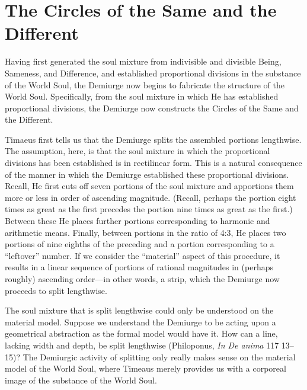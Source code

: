 
\section{The Circles of the Same and the Different} %
\label{sec:the_circles_of_the_same_and_the_different}

Having first generated the soul mixture from indivisible and divisible Being, Sameness, and Difference, and established proportional divisions in the substance of the World Soul, the Demiurge now begins to fabricate the structure of the World Soul. Specifically, from the soul mixture in which He has established proportional divisions, the Demiurge now constructs the Circles of the Same and the Different.

Timaeus first tells us that the Demiurge splits the assembled portions lengthwise. The assumption, here, is that the soul mixture in which the proportional divisions has been established is in rectilinear form. This is a natural consequence of the manner in which the Demiurge established these proportional divisions. Recall, He first cuts off seven portions of the soul mixture and apportions them more or less in order of ascending magnitude. (Recall, perhaps the portion eight times as great as the first precedes the portion nine times as great as the first.) Between these He places further portions corresponding to harmonic and arithmetic means. Finally, between portions in the ratio of 4:3, He places two portions of nine eighths of the preceding and a portion corresponding to a ``leftover'' number. If we consider the ``material'' aspect of this procedure, it results in a linear sequence of portions of rational magnitudes in (perhaps roughly) ascending order---in other words, a strip, which the Demiurge now proceeds to split lengthwise.

The soul mixture that is split lengthwise could only be understood on the material model. Suppose we understand the Demiurge to be acting upon a geometrical abstraction as the formal model would have it. How can a line, lacking width and depth, be split lengthwise (Philoponus, \emph{In De anima} 117 13--15)? The Demiurgic activity of splitting only really makes sense on the material model of the World Soul, where Timeaus merely provides us with a corporeal image of the substance of the World Soul.

